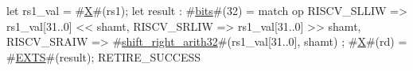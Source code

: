 let rs1_val = #\hyperref[sailRISCVzX]{X}#(rs1);
let result : #\hyperref[sailRISCVzbits]{bits}#(32) = match op {
  RISCV_SLLIW => rs1_val[31..0] << shamt,
  RISCV_SRLIW => rs1_val[31..0] >> shamt,
  RISCV_SRAIW => #\hyperref[sailRISCVzshiftzyrightzyarith32]{shift\_right\_arith32}#(rs1_val[31..0], shamt)
};
#\hyperref[sailRISCVzX]{X}#(rd) = #\hyperref[sailRISCVzEXTS]{EXTS}#(result);
RETIRE_SUCCESS
